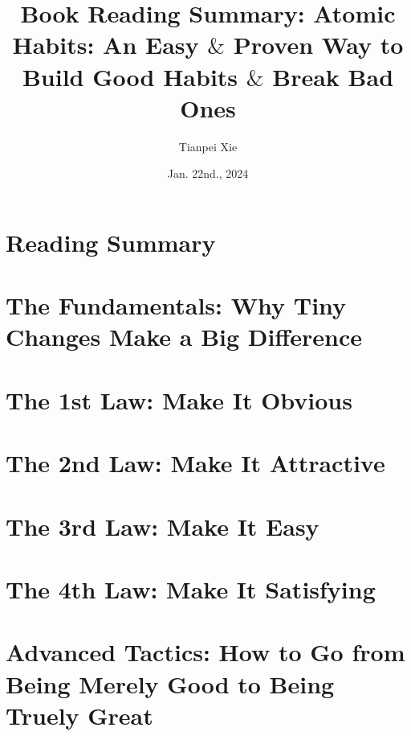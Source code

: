 \documentclass[11pt]{article}
\begin{document}
\title{Book Reading Summary: Atomic Habits: An Easy $\&$ Proven Way to Build Good Habits $\&$ Break Bad Ones}
\author{ Tianpei Xie}
\date{Jan. 22nd., 2024}
\maketitle
\tableofcontents
\newpage
\section{Reading Summary}

\newpage
\section{The Fundamentals: Why Tiny Changes Make a Big Difference}
\section{The 1st Law: Make It Obvious}
\section{The 2nd Law: Make It Attractive}
\section{The 3rd Law: Make It Easy}
\section{The 4th Law: Make It Satisfying}
\section{Advanced Tactics: How to Go from Being Merely Good to Being Truely Great}

\newpage


\end{document}
